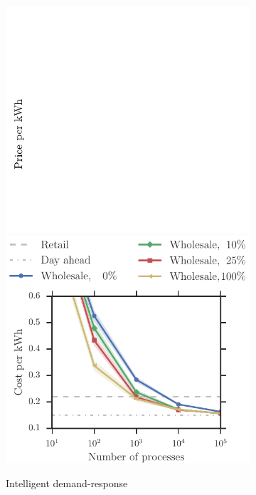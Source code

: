 \documentclass[conference]{IEEEtran}
\begin{document}
\begin{figure}[t!]
\begin{subfigure}[b]{0.32\textwidth}
   		\includegraphics[scale=0.7,clip=true, trim=0.3cm 0.0cm 8.7cm 3cm]{figures/ylabel.pdf}
	\includegraphics[width=1.0\textwidth, clip=true, trim=0.8cm 0 0 2cm]{figures/Wholesale_flex.pdf}
        \caption{Intelligent demand-response}
       \label{fig:wholesale_flex}
    \end{subfigure}
    \begin{subfigure}[b]{0.32\textwidth}

\end{subfigure}
\end{figure}
\end{document}
